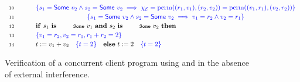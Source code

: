 \begin{figure*}
{{\[\begin{tabular}{r@{\ \ \ \ \ \ \ \ }c || c}
{  \!\!}%
%
\\ & \multicolumn{2}{c}{}\\[-5pt]
\Num{10} &
\multicolumn{2}{c}{
\spec{s_1 = \mathsf{Some}\ v_2 \wedge s_2 = \mathsf{Some}\ v_2
  \implies
\hist_{\cal E} = \text{perm}((r_1, v_1), (r_2, v_2)) = \text{perm}((v_1, r_1),
  (v_2, r_2))
}}
\\[2pt]
\Num{11} &
\multicolumn{2}{c}{
\spec{s_1 = \mathsf{Some}\ v_2 \wedge s_2 = \mathsf{Some}\ v_2
  \implies
v_1 = r_2 \wedge v_2 = r_1
}}
\\[2pt]
\Num{12} &
\multicolumn{2}{l}
{$\kw{if}~s_1~\kw{is}~\esc{Some}~v_1~\kw{and}~s_2~\kw{is}~\esc{Some}~v_2~\kw{then}$}
\\[2pt]
\Num{13} &
\multicolumn{2}{l}
{\spec{v_1 = r_2,  v_2 = r_1, r_1 + r_2 = 2}}
\\[2pt]
\Num{14} &
\multicolumn{2}{l}
{$t := v_1 + v_2$~~~{\spec{t = 2}}~~~$ \kw{else}~t := 2$~~~{\spec{t = 2}}}
\end{tabular} 
\]
}}  
\caption{Verification of a concurrent client program using
   and  in the absence of external
  interference.}
\label{fig:verif1}
\end{figure*}
